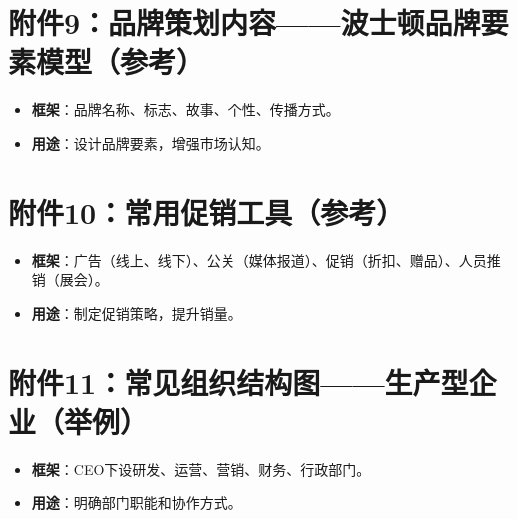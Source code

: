 \documentclass[UTF8]{report}
\theoremstyle{MyLineTheoremStyle} %
\theoremstyle{MyBlockTheoremStyle} %
\theoremstyle{MySubsubsectionStyle} %
\begin{document}
\section{附件9：品牌策划内容——波士顿品牌要素模型（参考）}
\begin{itemize}
    \item \textbf{框架}：品牌名称、标志、故事、个性、传播方式。
    \item \textbf{用途}：设计品牌要素，增强市场认知。
\end{itemize}

\section{附件10：常用促销工具（参考）}
\begin{itemize}
    \item \textbf{框架}：广告（线上、线下）、公关（媒体报道）、促销（折扣、赠品）、人员推销（展会）。
    \item \textbf{用途}：制定促销策略，提升销量。
\end{itemize}

\section{附件11：常见组织结构图——生产型企业（举例）}
\begin{itemize}
    \item \textbf{框架}：CEO下设研发、运营、营销、财务、行政部门。
    \item \textbf{用途}：明确部门职能和协作方式。
\end{itemize}
\end{document}
